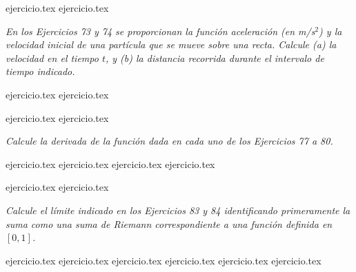 \begin{enumerate}
    \setcounter{enumi}{70}
    {ejercicio.tex}
    {ejercicio.tex}
\end{enumerate}

\vspace{1em}
\noindent \textit{En los Ejercicios 73 y 74 se proporcionan la función aceleración (en m/s$^2$) y la velocidad inicial de una partícula que se mueve sobre una recta. Calcule (a) la velocidad en el tiempo $t$, y (b) la distancia recorrida durante el intervalo de tiempo indicado.}

\begin{enumerate}
    \setcounter{enumi}{72}
    {ejercicio.tex}
    {ejercicio.tex}
\end{enumerate}

\begin{enumerate}
    \setcounter{enumi}{74}
    {ejercicio.tex}
    {ejercicio.tex}
\end{enumerate}

\vspace{1em}
\noindent \textit{Calcule la derivada de la función dada en cada uno de los Ejercicios 77 a 80.}

\begin{enumerate}
    \setcounter{enumi}{76}
    {ejercicio.tex}
    {ejercicio.tex}
    {ejercicio.tex}
    {ejercicio.tex}
\end{enumerate}

\begin{enumerate}
    \setcounter{enumi}{80}
    {ejercicio.tex}
    {ejercicio.tex}
\end{enumerate}

\vspace{1em}
\noindent \textit{Calcule el límite indicado en los Ejercicios 83 y 84 identificando primeramente la suma como una suma de Riemann correspondiente a una función definida en $[0, 1]$.}

\begin{enumerate}
    \setcounter{enumi}{82}
    {ejercicio.tex}
    {ejercicio.tex}
    {ejercicio.tex}
    {ejercicio.tex}
    {ejercicio.tex}
    {ejercicio.tex}
\end{enumerate}

